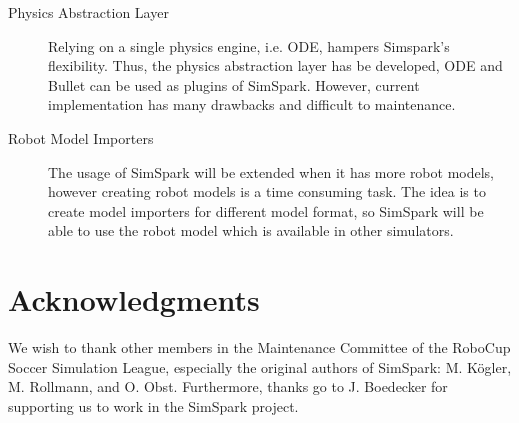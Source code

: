 \documentclass{llncs}
\newcommand{\review}[1]{\todo[inline,color=red]{REVIEW: #1}}
\begin{document}
\begin{description}
\item[Physics Abstraction Layer]
Relying on a single physics engine, i.e. ODE, hampers Simspark's flexibility.
Thus, the physics abstraction layer has be developed\cite{Held2010}, ODE and Bullet can be used as plugins of SimSpark. However, current implementation has many drawbacks and difficult to maintenance.

\item[Robot Model Importers]
The usage of SimSpark will be extended when it has more robot models, however creating robot models is a time consuming task. The idea is to create model importers for different model format, so SimSpark will be able to use the robot model which is available in other simulators.
\end{description}

\section*{Acknowledgments}
We wish to thank other members in the Maintenance Committee of the RoboCup Soccer Simulation League, especially the original authors of SimSpark: M. K\"ogler, M. Rollmann, and O. Obst. Furthermore, thanks go to J. Boedecker for supporting us to work in the SimSpark project.


\end{document}
